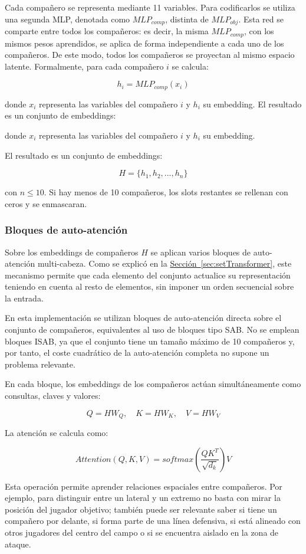 Cada compañero se representa mediante 11 variables. Para codificarlos se utiliza una segunda MLP, denotada como $MLP_{comp}$, distinta de $MLP_{obj}$. Esta red se comparte entre todos los compañeros: es decir, la misma $MLP_{comp}$, con los mismos pesos aprendidos, se aplica de forma independiente a cada uno de los compañeros. De este modo, todos los compañeros se proyectan al mismo espacio latente. Formalmente, para cada compañero $i$ se calcula:

\[
h_i = MLP_{comp}(x_i)
\]

donde $x_i$ representa las variables del compañero $i$ y $h_i$ su embedding. El resultado es un conjunto de embeddings:

donde $x_i$ representa las variables del compañero $i$ y $h_i$ su embedding.

El resultado es un conjunto de embeddings:

\[
H = \{h_1, h_2, ..., h_n\}
\]

con $n \leq 10$. Si hay menos de 10 compañeros, los slots restantes se rellenan con ceros y se enmascaran.

\subsubsection{Bloques de auto-atención}

Sobre los embeddings de compañeros $H$ se aplican varios bloques de auto-atención multi-cabeza. Como se explicó en la \hyperref[sec:setTransformer]{Sección~\ref*{sec:setTransformer}}, este mecanismo permite que cada elemento del conjunto actualice su representación teniendo en cuenta al resto de elementos, sin imponer un orden secuencial sobre la entrada.

En esta implementación se utilizan bloques de auto-atención directa sobre el conjunto de compañeros, equivalentes al uso de bloques tipo SAB. No se emplean bloques ISAB, ya que el conjunto tiene un tamaño máximo de 10 compañeros y, por tanto, el coste cuadrático de la auto-atención completa no supone un problema relevante.

En cada bloque, los embeddings de los compañeros actúan simultáneamente como consultas, claves y valores:


\[
Q = HW_Q,\quad K = HW_K,\quad V = HW_V
\]

La atención se calcula como:

\[
Attention(Q,K,V)=softmax\left(\frac{QK^T}{\sqrt{d_k}}\right)V
\]

Esta operación permite aprender relaciones espaciales entre compañeros. Por ejemplo, para distinguir entre un lateral y un extremo no basta con mirar la posición del jugador objetivo; también puede ser relevante saber si tiene un compañero por delante, si forma parte de una línea defensiva, si está alineado con otros jugadores del centro del campo o si se encuentra aislado en la zona de ataque.


